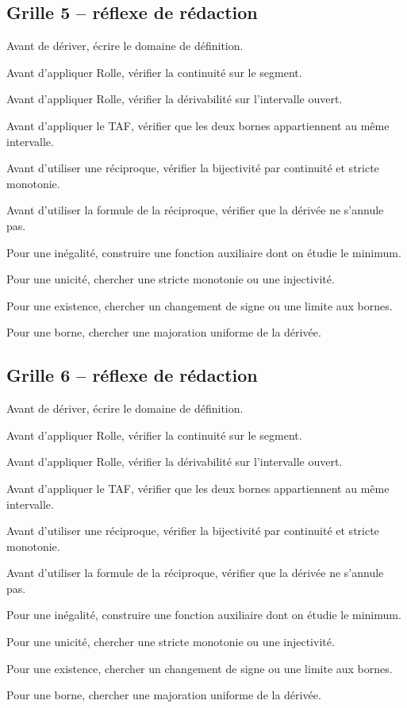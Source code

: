 \documentclass[11pt,a4paper]{article}
\begin{document}
\subsection*{Grille 5 -- réflexe de rédaction}

\begin{methodebox}

Avant de dériver, écrire le domaine de définition.

Avant d'appliquer Rolle, vérifier la continuité sur le segment.

Avant d'appliquer Rolle, vérifier la dérivabilité sur l'intervalle ouvert.

Avant d'appliquer le TAF, vérifier que les deux bornes appartiennent au même intervalle.

Avant d'utiliser une réciproque, vérifier la bijectivité par continuité et stricte monotonie.

Avant d'utiliser la formule de la réciproque, vérifier que la dérivée ne s'annule pas.

Pour une inégalité, construire une fonction auxiliaire dont on étudie le minimum.

Pour une unicité, chercher une stricte monotonie ou une injectivité.

Pour une existence, chercher un changement de signe ou une limite aux bornes.

Pour une borne, chercher une majoration uniforme de la dérivée.

\end{methodebox}

\subsection*{Grille 6 -- réflexe de rédaction}

\begin{methodebox}

Avant de dériver, écrire le domaine de définition.

Avant d'appliquer Rolle, vérifier la continuité sur le segment.

Avant d'appliquer Rolle, vérifier la dérivabilité sur l'intervalle ouvert.

Avant d'appliquer le TAF, vérifier que les deux bornes appartiennent au même intervalle.

Avant d'utiliser une réciproque, vérifier la bijectivité par continuité et stricte monotonie.

Avant d'utiliser la formule de la réciproque, vérifier que la dérivée ne s'annule pas.

Pour une inégalité, construire une fonction auxiliaire dont on étudie le minimum.

Pour une unicité, chercher une stricte monotonie ou une injectivité.

Pour une existence, chercher un changement de signe ou une limite aux bornes.

Pour une borne, chercher une majoration uniforme de la dérivée.

\end{methodebox}
\end{document}

